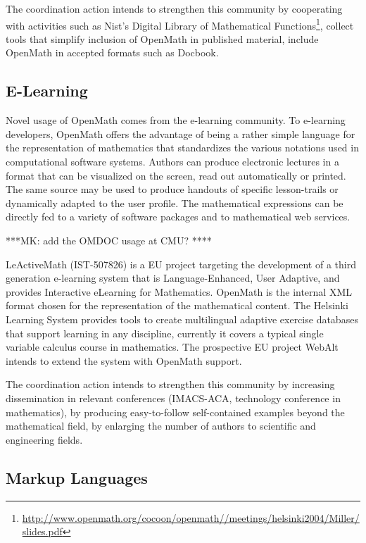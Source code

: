 \documentclass[draft]{artikel3}
\begin{document}
The coordination action intends to strengthen this community by
cooperating with activities such as Nist's Digital Library of
Mathematical
Functions\footnote{\url{http://www.openmath.org/cocoon/openmath//meetings/helsinki2004/Miller/slides.pdf}},
collect tools that simplify inclusion of OpenMath in published
material, include OpenMath in accepted formats such as Docbook.


\subsection{E-Learning}
\label{sec:e-learn}
Novel usage of OpenMath comes from the e-learning community. To
e-learning developers, OpenMath offers the advantage of being a rather
simple language for the representation of mathematics that
standardizes the various notations used in computational software
systems. Authors can produce electronic lectures in a format that can
be visualized on the screen, read out automatically or printed. The
same source may be used to produce handouts of specific lesson-trails
or dynamically adapted to the user profile. The mathematical
expressions can be directly fed to a variety of software packages and
to mathematical web services.

***MK: add the OMDOC usage at CMU? ****

LeActiveMath (IST-507826) is a EU project targeting the development of
a third generation e-learning system that is Language-Enhanced, User
Adaptive, and provides Interactive eLearning for Mathematics. OpenMath
is the internal XML format chosen for the representation of the
mathematical content.  The Helsinki Learning System provides tools to
create multilingual adaptive exercise databases that support learning
in any discipline, currently it covers a typical single variable
calculus course in mathematics. The prospective EU project WebAlt
intends to extend the system with OpenMath support.


The coordination action intends to strengthen this community by
increasing dissemination in relevant conferences (IMACS-ACA,
technology conference in mathematics), by producing easy-to-follow
self-contained examples beyond the mathematical field, by enlarging
the number of authors to scientific and engineering fields.


\subsection{Markup Languages}
\label{sec:ml}
\end{document}
